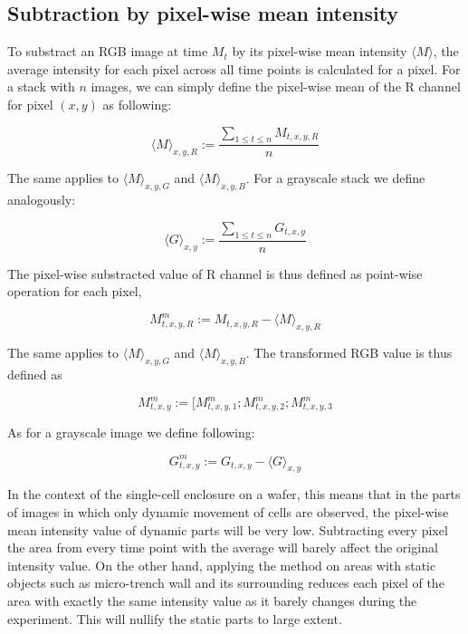 \documentclass[pdftex,12pt,a4paper]{report}
\begin{document}
\subsection{Subtraction by pixel-wise mean intensity}
\label{subsection:substraction_by_mean}

To substract an RGB image at time $M_t$ by its pixel-wise mean intensity $\langle M \rangle$, the average intensity for each pixel across all time points is calculated  for a pixel. For a stack with $n$ images, we can simply define the pixel-wise mean of the R channel for pixel $(x, y)$ as following:

\begin{equation}
\langle M \rangle_{x, y, R} := \frac{\sum_{1 \leq t \leq n} M_{t, x, y, R}}{n}
\label{eq:mean_calc_rgb}
\end{equation}

The same applies to $\langle M \rangle_{x, y, G}$ and $\langle M \rangle_{x, y, B}$. For a grayscale stack we define analogously:

\begin{equation}
\langle G \rangle_{x, y} := \frac{\sum_{1 \leq t \leq n} G_{t, x, y }}{n}
\label{eq:mean_calc_gs}
\end{equation}

The pixel-wise substracted value of R channel is thus defined as point-wise operation for each pixel,

\begin{equation}
M^m_{t, x, y, R} := M_{t, x, y, R} - \langle M \rangle_{x, y, R}
\label{eq:mean_corr_rgb}
\end{equation}

The same applies to $\langle M \rangle_{x, y, G}$ and $\langle M \rangle_{x, y, B}$. The transformed RGB value is thus defined as

\begin{equation}
M^m_{t, x, y} := [M^m_{t, x, y, 1}; M^m_{t, x, y, 2}; M^m_{t, x, y, 3}
\end{equation}

As for a grayscale image we define following:

\begin{equation}
G^m_{t, x, y} := G_{t, x, y} - \langle G \rangle_{x, y}
\label{eq:mean_corr_gs}
\end{equation}

In the context of the single-cell enclosure on a wafer, this means that in the parts of images in which only dynamic movement of cells are observed, the pixel-wise mean intensity value of dynamic parts will be very low. Subtracting every pixel the area from every time point with the average will barely affect the original intensity value. On the other hand, applying the method on areas with static objects such as micro-trench wall and its surrounding reduces each pixel of the area with exactly the same intensity value as it barely changes during the experiment. This will nullify the static parts to large extent.
\end{document}
